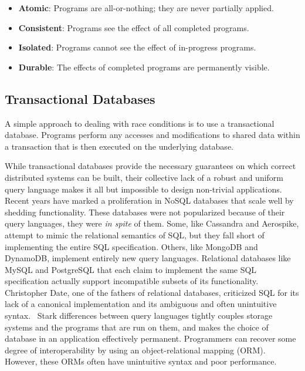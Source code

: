 \documentclass[../main.tex]{subfiles}
\begin{document}
\begin{itemize}
  \item \textbf{Atomic}: Programs are all-or-nothing; they are never partially applied.
  \item \textbf{Consistent}: Programs see the effect of all completed programs.
  \item \textbf{Isolated}: Programs cannot see the effect of in-progress programs.
  \item \textbf{Durable}: The effects of completed programs are permanently visible.
\end{itemize}

  \subsection{Transactional Databases}
  A simple approach to dealing with race conditions is to use a transactional database. Programs
  perform any accesses and modifications to shared data within a transaction that is then executed
  on the underlying database.

  While transactional databases provide the necessary guarantees on which correct distributed
  systems can be built, their collective lack of a robust and uniform query language makes it all
  but impossible to design non-trivial applications. Recent years have marked a proliferation
  in NoSQL databases that scale well by shedding functionality. These databases were not popularized
  because of their query languages, they were \emph{in spite} of them. Some, like Cassandra and
  Aerospike, attempt to mimic the relational semantics of SQL, but they fall short of implementing
  the entire SQL specification. Others, like MongoDB and DynamoDB, implement entirely new query
  languages. Relational databases like MySQL and PostgreSQL that each claim to implement the same
  SQL specification actually support incompatible subsets of its functionality. Christopher Date,
  one of the fathers of relational databases, criticized SQL for its lack of a canonical
  implementation and its ambiguous and often unintuitive syntax.~\cite{sql} Stark differences
  between query languages tightly couples storage systems and the programs that are run on them, and
  makes the choice of database in an application effectively permanent. Programmers can recover some
  degree of interoperability by using an object-relational mapping (ORM). However, these ORMs often
  have unintuitive syntax and poor performance.

\end{document}
